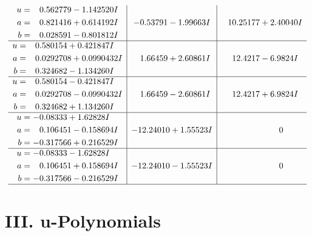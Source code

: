 \documentclass[1p]{elsarticle_modified}
\theoremstyle{definition}
\begin{document}
$$\begin{array}{c|c|c}
\begin{aligned}
u &= \phantom{-}0.562779 - 1.142520 I \\
a &= \phantom{-}0.821416 + 0.614192 I \\
b &= \phantom{-}0.028591 - 0.801812 I\end{aligned}
 & -0.53791 - 1.99663 I & \phantom{-}10.25177 + 2.40040 I \\ \hline\begin{aligned}
u &= \phantom{-}0.580154 + 0.421847 I \\
a &= \phantom{-}0.0292708 + 0.0990432 I \\
b &= \phantom{-}0.324682 - 1.134260 I\end{aligned}
 & \phantom{-}1.66459 + 2.60861 I & \phantom{-}12.4217 - 6.9824 I \\ \hline\begin{aligned}
u &= \phantom{-}0.580154 - 0.421847 I \\
a &= \phantom{-}0.0292708 - 0.0990432 I \\
b &= \phantom{-}0.324682 + 1.134260 I\end{aligned}
 & \phantom{-}1.66459 - 2.60861 I & \phantom{-}12.4217 + 6.9824 I \\ \hline\begin{aligned}
u &= -0.08333 + 1.62828 I \\
a &= \phantom{-}0.106451 - 0.158694 I \\
b &= -0.317566 + 0.216529 I\end{aligned}
 & -12.24010 + 1.55523 I & \phantom{-0.000000 } 0 \\ \hline\begin{aligned}
u &= -0.08333 - 1.62828 I \\
a &= \phantom{-}0.106451 + 0.158694 I \\
b &= -0.317566 - 0.216529 I\end{aligned}
 & -12.24010 - 1.55523 I & \phantom{-0.000000 } 0\\
 \hline 
 \end{array}$$\newpage
\newpage\renewcommand{\arraystretch}{1}
\centering \section*{ III. u-Polynomials}
\end{document}
